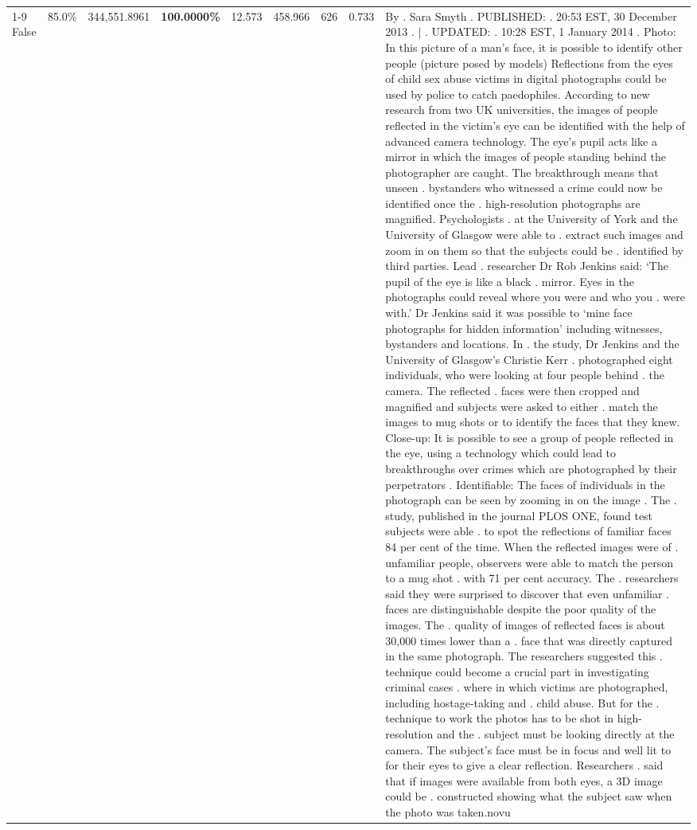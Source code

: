 \begin{table}[H]
\begin{tabular}{lllrlllll}
\cline{1-9}
False & 85.0\% & 344,551.8961 & \bfseries \color{red} 100.0000\% & 12.573 & 458.966 & 626 & 0.733 & By . Sara Smyth . PUBLISHED: . 20:53 EST, 30 December 2013 . | . UPDATED: . 10:28 EST, 1 January 2014 . Photo: In this picture of a man's face, it is possible to identify other people (picture posed by models) Reflections from the eyes of child sex abuse victims in digital photographs could be used by police to catch paedophiles. According to new research from two UK universities, the images of people reflected in the victim's eye can be identified with the help of advanced camera technology. The eye's pupil acts like a mirror in which the images of people standing behind the photographer are caught. The breakthrough means that unseen . bystanders who witnessed a crime could now be identified once the . high-resolution photographs are magnified. Psychologists . at the University of York and the University of Glasgow were able to . extract such images and zoom in on them so that the subjects could be . identified by third parties. Lead . researcher Dr Rob Jenkins said: ‘The pupil of the eye is like a black . mirror. Eyes in the photographs could reveal where you were and who you . were with.' Dr Jenkins said it was possible to ‘mine face photographs for hidden information' including witnesses, bystanders and locations. In . the study, Dr Jenkins and the University of Glasgow's Christie Kerr . photographed eight individuals, who were looking at four people behind . the camera. The reflected . faces were then cropped and magnified and subjects were asked to either . match the images to mug shots or to identify the faces that they knew. Close-up: It is possible to see a group of people reflected in the eye, using a technology which could lead to breakthroughs over crimes which are photographed by their perpetrators . Identifiable: The faces of individuals in the photograph can be seen by zooming in on the image . The . study, published in the journal PLOS ONE, found test subjects were able . to spot the reflections of familiar faces 84 per cent of the time. When the reflected images were of . unfamiliar people, observers were able to match the person to a mug shot . with 71 per cent accuracy. The . researchers said they were surprised to discover that even unfamiliar . faces are distinguishable despite the poor quality of the images. The . quality of images of reflected faces is about 30,000 times lower than a . face that was directly captured in the same photograph. The researchers suggested this . technique could become a crucial part in investigating criminal cases . where in which victims are photographed, including hostage-taking and . child abuse. But for the . technique to work the photos has to be shot in high-resolution and the . subject must be looking directly at the camera. The subject's face must be in focus and well lit to for their eyes to give a clear reflection. Researchers . said that if images were available from both eyes, a 3D image could be . constructed showing what the subject saw when the photo was taken.novu \\

\end{tabular}
\end{table}
